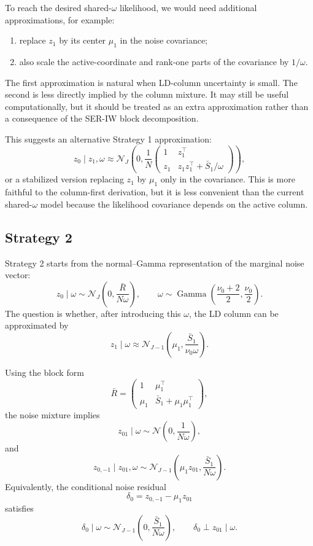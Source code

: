 \documentclass[11pt]{article}
\newcommand{\Rbar}{\bar R}
\newcommand{\Normal}{\mathcal N}
\newcommand{\Gam}{\operatorname{Gamma}}
\begin{document}
To reach the desired shared-\(\omega\) likelihood, we would need additional
approximations, for example:
\begin{enumerate}[leftmargin=*]
\item replace \(z_1\) by its center \(\mu_1\) in the noise covariance;
\item also scale the active-coordinate and rank-one parts of the covariance by
\(1/\omega\).
\end{enumerate}
The first approximation is natural when LD-column uncertainty is small. The
second is less directly implied by the column mixture. It may still be useful
computationally, but it should be treated as an extra approximation rather
than a consequence of the SER-IW block decomposition.

This suggests an alternative Strategy 1 approximation:
\[
z_0\mid z_1,\omega
\approx
\Normal_J\left(
0,
\frac1N
\begin{pmatrix}
1 & z_1^\top\\
z_1 & z_1z_1^\top+\bar S_1/\omega
\end{pmatrix}
\right),
\]
or a stabilized version replacing \(z_1\) by \(\mu_1\) only in the covariance.
This is more faithful to the column-first derivation, but it is less convenient
than the current shared-\(\omega\) model because the likelihood covariance
depends on the active column.


\subsection{Strategy 2}

Strategy 2 starts from the normal--Gamma representation of the marginal noise
vector:
\[
z_0\mid \omega
\sim
\Normal_J\left(0,\frac{\Rbar}{N\omega}\right),
\qquad
\omega\sim
\Gam\left(\frac{\nu_0+2}{2},\frac{\nu_0}{2}\right).
\]
The question is whether, after introducing this \(\omega\), the LD column can
be approximated by
\[
z_1\mid \omega
\approx
\Normal_{J-1}\left(
\mu_1,\frac{\bar S_1}{\nu_0\omega}
\right).
\]

Using the block form
\[
\Rbar=
\begin{pmatrix}
1 & \mu_1^\top\\
\mu_1 & \bar S_1+\mu_1\mu_1^\top
\end{pmatrix},
\]
the noise mixture implies
\[
z_{01}\mid \omega
\sim
\Normal\left(0,\frac{1}{N\omega}\right),
\]
and
\[
z_{0,-1}\mid z_{01},\omega
\sim
\Normal_{J-1}\left(
\mu_1z_{01},
\frac{\bar S_1}{N\omega}
\right).
\]
Equivalently, the conditional noise residual
\[
\delta_0=z_{0,-1}-\mu_1z_{01}
\]
satisfies
\[
\delta_0\mid \omega
\sim
\Normal_{J-1}\left(
0,\frac{\bar S_1}{N\omega}
\right),
\qquad
\delta_0\perp z_{01}\mid\omega.
\]
\end{document}
